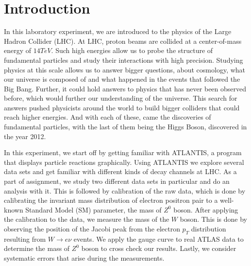 \documentclass[a4paper]{report}
\numberwithin{equation}{section}
\begin{document}
\tableofcontents

\chapter{Introduction} \label{chap:intro}

In this laboratory experiment, we are introduced to the physics of the Large Hadron Collider (LHC). At LHC, proton beams are collided at a center-of-mass energy of $14 TeV$. Such high energies allow us to probe the structure of fundamental particles and study their interactions with high precision. Studying physics at this scale allows us to answer bigger questions, about cosmology, what our universe is composed of and what happened in the events that followed the Big Bang. Further, it could hold answers to physics that has never been observed before, which would further our understanding of the universe. 
This search for answers pushed physicists around the world to build bigger colliders that could reach higher energies. And with each of these, came the discoveries of fundamental particles, with the last of them being the Higgs Boson, discovered in the year 2012. 

In this experiment, we start off by getting familiar with ATLANTIS, a program that displays particle reactions graphically. Using ATLANTIS we explore several data sets and get familiar with different kinds of decay channels at LHC. As a part of assignment, we study two different data sets in particular and do an analysis with it. This is followed by calibration of the raw data, which is done by calibrating the invariant mass distribution of electron positron pair to a well-known Standard Model (SM) parameter, the mass of $Z^0$ boson. After applying the calibration to the data, we measure the mass of the $W$ boson. This is done by observing the position of the Jacobi peak from the electron $p_T$ distribution resulting from $W \rightarrow e\nu$ 
events. We apply the gauge curve to real ATLAS data to determine the mass of $Z^0$ boson to cross check our results. Lastly, we consider systematic errors that arise during the measurements. 
\end{document}
